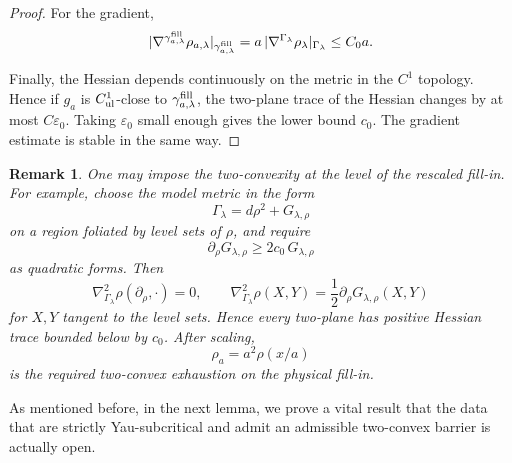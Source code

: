 \documentclass{amsart}
\newtheorem{remark}{Remark}
\begin{document}
{\begin{proof}
\noindent For the gradient,
\[
        |\nabla^{\gamma^{\rm fill}_{a,\lambda}}\rho_{a,\lambda}|_{\gamma^{\rm fill}_{a,\lambda}}
        =
        a\,|\nabla^{\Gamma_\lambda}\rho_\lambda|_{\Gamma_\lambda}
        \le C_0a.
\]

\noindent Finally, the Hessian depends continuously on the metric in the \(C^1\)
topology. Hence if \(g_a\) is \(C^1_{\rm ul}\)-close to
\(\gamma^{\rm fill}_{a,\lambda}\), the two-plane trace of the Hessian
changes by at most \(C\varepsilon_0\). Taking \(\varepsilon_0\) small
enough gives the lower bound \(c_0\). The gradient estimate is stable
in the same way.
\end{proof}


\begin{remark}
One may impose the two-convexity at the level of the rescaled fill-in.
For example, choose the model metric in the form
\[
        \Gamma_\lambda=d\rho^2+G_{\lambda,\rho}
\]
on a region foliated by level sets of \(\rho\), and require
\[
        \partial_\rho G_{\lambda,\rho}
        \ge 2c_0\,G_{\lambda,\rho}
\]
as quadratic forms. Then
\[
        \nabla^2_{\Gamma_\lambda}\rho(\partial_\rho,\cdot)=0,
        \qquad
        \nabla^2_{\Gamma_\lambda}\rho(X,Y)
        =
        \frac12\partial_\rho G_{\lambda,\rho}(X,Y)
\]
for \(X,Y\) tangent to the level sets. Hence every two-plane has
positive Hessian trace bounded below by \(c_0\). After scaling,
\[
        \rho_a=a^2\rho(x/a)
\]
is the required two-convex exhaustion on the physical fill-in.
\end{remark}




\noindent As mentioned before, in the next lemma, we prove a vital result that the data that are strictly Yau-subcritical and admit an admissible two-convex barrier is actually open. 

}
\end{document}

